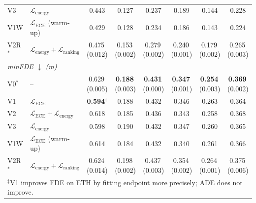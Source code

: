 \documentclass[journal]{IEEEtran}
\begin{document}
\begin{table}[tp]
\begin{tabular}{l l c c c c c c}
V3   & $\mathcal{L}_\mathrm{energy}$
  & 0.443 & 0.127 & 0.237 & 0.189 & 0.144 & 0.228 \\
V1W  & $\mathcal{L}_\mathrm{ECE}$ (warm-up)
  & 0.429 & 0.128 & 0.234 & 0.186 & 0.143 & 0.224 \\
V2R$^*$ & $\mathcal{L}_\mathrm{energy}{+}\mathcal{L}_\mathrm{ranking}$
  & 0.475\,(0.012) & 0.153\,(0.002) & 0.279\,(0.002)
  & 0.240\,(0.001) & 0.179\,(0.002) & 0.265\,(0.003) \\
\midrule
\multicolumn{8}{l}{\textit{minFDE $\downarrow$ (m)}} \\[1pt]
V0$^*$  & --
  & 0.629\,(0.005) & \textbf{0.188}\,(0.003)
  & \textbf{0.431}\,(0.000) & \textbf{0.347}\,(0.001)
  & \textbf{0.254}\,(0.003) & \textbf{0.369}\,(0.002) \\
V1   & $\mathcal{L}_\mathrm{ECE}$
  & \textbf{0.594}$^\ddagger$ & 0.188 & 0.432 & 0.346 & 0.263 & 0.364 \\
V2   & $\mathcal{L}_\mathrm{ECE}{+}\mathcal{L}_\mathrm{energy}$
  & 0.618 & 0.185 & 0.436 & 0.343 & 0.258 & 0.368 \\
V3   & $\mathcal{L}_\mathrm{energy}$
  & 0.598 & 0.190 & 0.432 & 0.347 & 0.260 & 0.365 \\
V1W  & $\mathcal{L}_\mathrm{ECE}$ (warm-up)
  & 0.614 & 0.184 & 0.432 & 0.340 & 0.261 & 0.366 \\
V2R$^*$ & $\mathcal{L}_\mathrm{energy}{+}\mathcal{L}_\mathrm{ranking}$
  & 0.624\,(0.014) & 0.198\,(0.002) & 0.437\,(0.003)
  & 0.354\,(0.002) & 0.264\,(0.001) & 0.375\,(0.006) \\
\bottomrule
\multicolumn{8}{l}{{\scriptsize
  $^\ddagger$V1 improves FDE on ETH by fitting endpoint more precisely; ADE does not improve.}} \\
\end{tabular}
\end{table}

\end{document}
